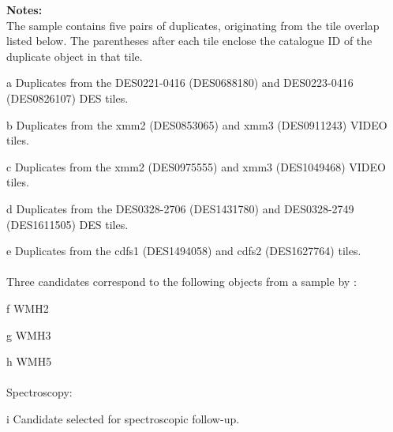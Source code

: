 {\begin{ThreePartTable}
\begin{TableNotes}[]
\onehalfspacing
\textbf{Notes:}\\
The sample contains five pairs of duplicates, originating from the tile overlap listed below. The parentheses after each tile  enclose the catalogue ID of the duplicate object in that tile.\\
\item[a] Duplicates from the DES0221-0416 (DES0688180) and DES0223-0416 (DES0826107) DES tiles. \\
\item[b] Duplicates from the xmm2 (DES0853065) and xmm3 (DES0911243) VIDEO tiles. \\
\item[c] Duplicates from the xmm2 (DES0975555) and xmm3 (DES1049468) VIDEO tiles. \\
\item[d] Duplicates from the DES0328-2706 (DES1431780) and DES0328-2749 (DES1611505) DES tiles. \\
\item[e] Duplicates from the cdfs1 (DES1494058) and cdfs2 (DES1627764) tiles. \\
\vspace{-0.7em} \\
Three candidates correspond to the following objects from a sample by  \cite{2013AJ....145....4W}: \\
\item[f] WMH2 \\
\item[g] WMH3 \\
\item[h] WMH5 \\
\vspace{-0.7em} \\
Spectroscopy:\\
\item[i] Candidate selected for spectroscopic follow-up. \\
\vspace{0.5em}
\end{TableNotes}


\end{ThreePartTable}}
